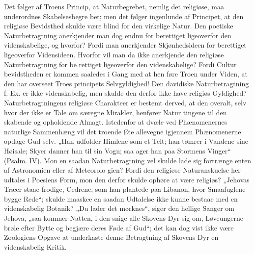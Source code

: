 \documentclass[12pt]{book}
\newcommand{\opage}[1]{\marginnote{\footnotesize\textit{[#1]}}}
\begin{document}
\opage{168}\setcounter{footnote}{0}%
Det følger af Troens Princip, at Naturbegrebet,
nemlig det religiøse, maa underordnes Skabelsesbegre\-%
bet; men det følger ingenlunde af Principet, at den
religiøse Bevidsthed skulde være blind for den virkelige
Natur. Den poetiske Naturbetragtning anerkjender man
dog endnu for berettiget ligeoverfor den videnskabelige,
og hvorfor? Fordi man anerkjender Skjønhedsideen for
berettiget ligeoverfor Vidensideen. Hvorfor vil man da
ikke anerkjende den religiøse Naturbetragtning for be\-%
rettiget ligeoverfor den videnskabelige? Fordi Cultur\-%
bevidstheden er kommen saaledes i Gang med at hen\-%
føre Troen under Viden, at den har overseet Troes\-%
principets Selvgyldighed! Den davidiske Naturbetragtning
f. Ex. er ikke videnskabelig, men skulde den derfor ikke
have religiøs Gyldighed? Naturbetragtningens religiøse
Charakteer er bestemt derved, at den overalt, selv hvor
der ikke er Tale om særegne Mirakler, henfører Natur\-%
tingene til den skabende og opholdende Almagt. Istedenfor
at dvæle ved Phænomenernes naturlige Sammenhæng vil
det troende Øie allevegne igjennem Phænomenerne opdage
Gud selv. „Han udfolder Himlene som et Telt; han
tømrer i Vandene sine Høisale; Skyer danner han til
sin Vogn; saa ager han paa Stormens Vinger“ (Psalm.
IV). Mon en saadan Naturbetragtning vel skulde lade
sig fortrænge enten af Astronomien eller af Meteorolo\-%
gien? Fordi den religiøse Naturanskuelse her udtales i
Poesiens Form, mon den derfor skulde ophøre at være
religiøs? „Jehovas Træer staae frodige, Cedrene, som
han plantede paa Libanon, hvor Smaafuglene bygge
Rede“; skulde maaskee en saadan Udtalelse ikke kunne
bestaae med en videnskabelig Botanik? „Du lader det
mørknes“, siger den hellige Sanger om Jehova, „saa
kommer Natten, i den snige alle Skovens Dyr sig om,
Løveungerne brøle efter Bytte og begjære deres Føde
\opage{169}\setcounter{footnote}{0}%
af Gud“; det kan dog vist ikke være Zoologiens Opgave
at underkaste denne Betragtning af Skovens Dyr en
videnskabelig Kritik.
\end{document}
